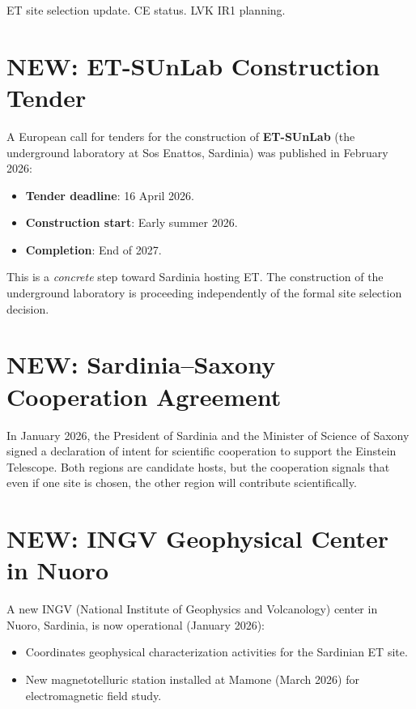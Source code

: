 \documentclass[11pt,a4paper]{article}
\newcommand{\NEW}{\textcolor{dfdblue}{\textbf{NEW}}}
\begin{document}
ET site selection update. CE status. LVK IR1 planning.

\section{\NEW: ET-SUnLab Construction Tender}

\begin{tcolorbox}[colback=blue!5!white, colframe=blue!60!black,
  title={ET-SUnLab at Sos Enattos: European Tender Published}]

A European call for tenders for the construction of \textbf{ET-SUnLab} (the underground laboratory at Sos Enattos, Sardinia) was published in February 2026:
\begin{itemize}
\item \textbf{Tender deadline}: 16 April 2026.
\item \textbf{Construction start}: Early summer 2026.
\item \textbf{Completion}: End of 2027.
\end{itemize}

This is a \emph{concrete} step toward Sardinia hosting ET. The construction of the underground laboratory is proceeding independently of the formal site selection decision.
\end{tcolorbox}

\section{\NEW: Sardinia--Saxony Cooperation Agreement}

In January 2026, the President of Sardinia and the Minister of Science of Saxony signed a declaration of intent for scientific cooperation to support the Einstein Telescope. Both regions are candidate hosts, but the cooperation signals that even if one site is chosen, the other region will contribute scientifically.

\section{\NEW: INGV Geophysical Center in Nuoro}

A new INGV (National Institute of Geophysics and Volcanology) center in Nuoro, Sardinia, is now operational (January 2026):
\begin{itemize}
\item Coordinates geophysical characterization activities for the Sardinian ET site.
\item New magnetotelluric station installed at Mamone (March 2026) for electromagnetic field study.
\end{itemize}
\end{document}
